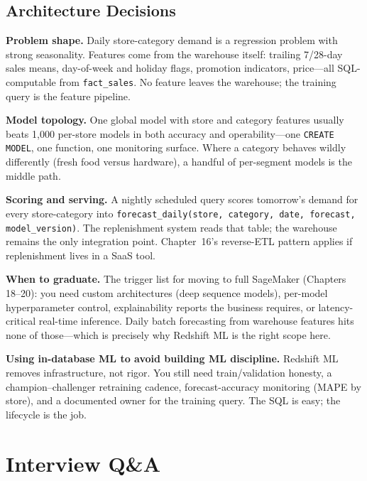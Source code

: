 \subsection{Architecture Decisions}
\textbf{Problem shape.} Daily store-category demand is a regression problem with strong seasonality. Features come from the warehouse itself: trailing 7/28-day sales means, day-of-week and holiday flags, promotion indicators, price---all SQL-computable from \texttt{fact\_sales}. No feature leaves the warehouse; the training query is the feature pipeline.

\textbf{Model topology.} One global model with store and category features usually beats 1{,}000 per-store models in both accuracy and operability---one \texttt{CREATE MODEL}, one function, one monitoring surface. Where a category behaves wildly differently (fresh food versus hardware), a handful of per-segment models is the middle path.

\textbf{Scoring and serving.} A nightly scheduled query scores tomorrow's demand for every store-category into \texttt{forecast\_daily(store, category, date, forecast, model\_version)}. The replenishment system reads that table; the warehouse remains the only integration point. Chapter~16's reverse-ETL pattern applies if replenishment lives in a SaaS tool.

\textbf{When to graduate.} The trigger list for moving to full SageMaker (Chapters 18--20): you need custom architectures (deep sequence models), per-model hyperparameter control, explainability reports the business requires, or latency-critical real-time inference. Daily batch forecasting from warehouse features hits none of those---which is precisely why Redshift ML is the right scope here.

\begin{pitfall}
\textbf{Using in-database ML to avoid building ML discipline.} Redshift ML removes infrastructure, not rigor. You still need train/validation honesty, a champion--challenger retraining cadence, forecast-accuracy monitoring (MAPE by store), and a documented owner for the training query. The SQL is easy; the lifecycle is the job.
\end{pitfall}

\section{Interview Q\&A}
